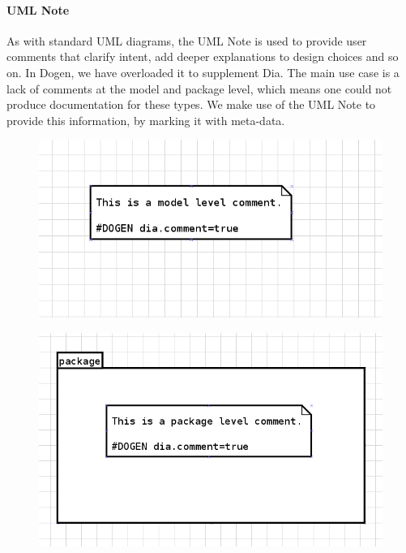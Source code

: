 \documentclass{book}
\begin{document}
\paragraph{UML Note}

As with standard UML diagrams, the UML Note is used to provide user
comments that clarify intent, add deeper explanations to design
choices and so on. In Dogen, we have overloaded it to supplement
Dia. The main use case is a lack of comments at the model and package
level, which means one could not produce documentation for these
types. We make use of the UML Note to provide this information, by
marking it with meta-data.

\begin{figure}[H]
    \centering
    \includegraphics[scale=0.4]{images/model_level_comment.png}
    \caption{}
\end{figure}

\begin{figure}[H]
    \centering
    \includegraphics[scale=0.4]{images/package_level_comment.png}
    \caption{}
\end{figure}
\end{document}
